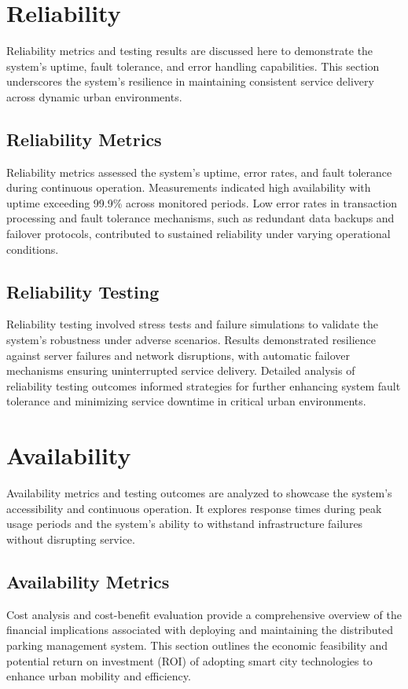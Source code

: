 \documentclass[oneside, 12pt, a4paper]{book}
\begin{document}
\chapter{Reliability}
Reliability metrics and testing results are discussed here to demonstrate the system's uptime, fault tolerance, and error handling capabilities. This section underscores the system's resilience in maintaining consistent service delivery across dynamic urban environments.
\section{Reliability Metrics}

Reliability metrics assessed the system's uptime, error rates, and fault tolerance during continuous operation. Measurements indicated high availability with uptime exceeding 99.9\% across monitored periods. Low error rates in transaction processing and fault tolerance mechanisms, such as redundant data backups and failover protocols, contributed to sustained reliability under varying operational conditions.
\section{Reliability Testing}

Reliability testing involved stress tests and failure simulations to validate the system's robustness under adverse scenarios. Results demonstrated resilience against server failures and network disruptions, with automatic failover mechanisms ensuring uninterrupted service delivery. Detailed analysis of reliability testing outcomes informed strategies for further enhancing system fault tolerance and minimizing service downtime in critical urban environments.
\chapter{Availability}
Availability metrics and testing outcomes are analyzed to showcase the system's accessibility and continuous operation. It explores response times during peak usage periods and the system's ability to withstand infrastructure failures without disrupting service.
\section{Availability Metrics}
Cost analysis and cost-benefit evaluation provide a comprehensive overview of the financial implications associated with deploying and maintaining the distributed parking management system. This section outlines the economic feasibility and potential return on investment (ROI) of adopting smart city technologies to enhance urban mobility and efficiency.
\end{document}
